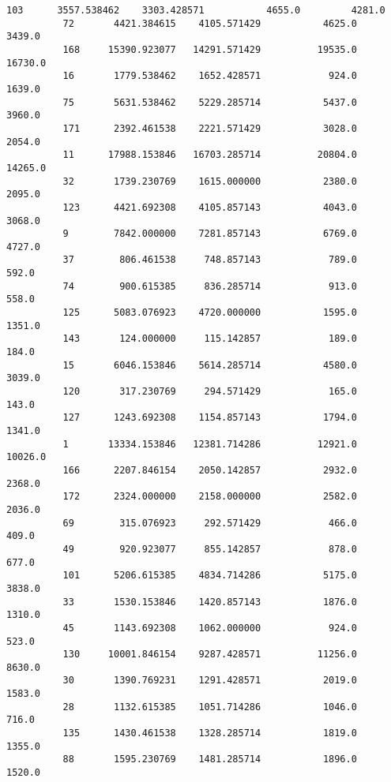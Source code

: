 \documentclass[11pt]{article}
\begin{document}
\begin{Verbatim}[commandchars=\\\{\}]
          103      3557.538462    3303.428571           4655.0         4281.0   
          72       4421.384615    4105.571429           4625.0         3439.0   
          168     15390.923077   14291.571429          19535.0        16730.0   
          16       1779.538462    1652.428571            924.0         1639.0   
          75       5631.538462    5229.285714           5437.0         3960.0   
          171      2392.461538    2221.571429           3028.0         2054.0   
          11      17988.153846   16703.285714          20804.0        14265.0   
          32       1739.230769    1615.000000           2380.0         2095.0   
          123      4421.692308    4105.857143           4043.0         3068.0   
          9        7842.000000    7281.857143           6769.0         4727.0   
          37        806.461538     748.857143            789.0          592.0   
          74        900.615385     836.285714            913.0          558.0   
          125      5083.076923    4720.000000           1595.0         1351.0   
          143       124.000000     115.142857            189.0          184.0   
          15       6046.153846    5614.285714           4580.0         3039.0   
          120       317.230769     294.571429            165.0          143.0   
          127      1243.692308    1154.857143           1794.0         1341.0   
          1       13334.153846   12381.714286          12921.0        10026.0   
          166      2207.846154    2050.142857           2932.0         2368.0   
          172      2324.000000    2158.000000           2582.0         2036.0   
          69        315.076923     292.571429            466.0          409.0   
          49        920.923077     855.142857            878.0          677.0   
          101      5206.615385    4834.714286           5175.0         3838.0   
          33       1530.153846    1420.857143           1876.0         1310.0   
          45       1143.692308    1062.000000            924.0          523.0   
          130     10001.846154    9287.428571          11256.0         8630.0   
          30       1390.769231    1291.428571           2019.0         1583.0   
          28       1132.615385    1051.714286           1046.0          716.0   
          135      1430.461538    1328.285714           1819.0         1355.0   
          88       1595.230769    1481.285714           1896.0         1520.0   
          

\end{Verbatim}
\end{document}
